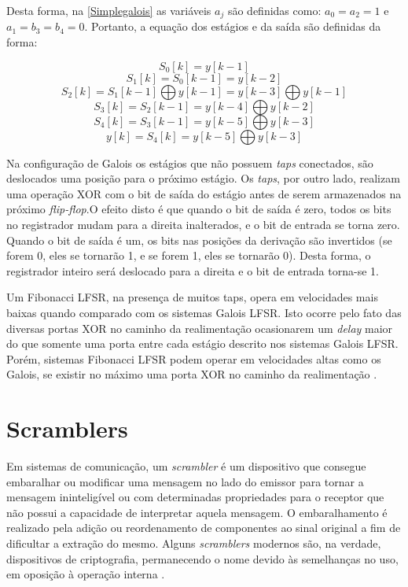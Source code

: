 Desta forma, na \autoref{Simplegalois} as variáveis $ a_{j} $ são definidas como: $ a_{0} = a_{2} = 1 $ e $ a_{1} = b_{3} = b_{4} = 0 $. Portanto, a equação dos estágios e da saída são definidas da forma:

$$ S_{0}[k] = y[k-1]  $$
$$ S_{1}[k] = S_{0}[k-1] = y[k-2]  $$
$$ S_{2}[k] = S_{1}[k-1] \bigoplus y[k-1] = y[k-3] \bigoplus y[k-1] $$
$$ S_{3}[k] = S_{2}[k-1]  =  y[k-4] \bigoplus y[k-2] $$
$$ S_{4}[k] = S_{3}[k-1]  =  y[k-5] \bigoplus y[k-3] $$
$$ y[k] = S_{4}[k] = y[k-5] \bigoplus y[k-3] $$

Na configuração de Galois os estágios que não possuem \textit{taps} conectados, são deslocados uma posição para o próximo estágio. Os \textit{taps}, por outro lado, realizam uma operação XOR com o bit de saída do estágio antes de serem armazenados na próximo \textit{flip-flop}.O efeito disto é que quando o bit de saída é zero, todos os bits no registrador mudam para a direita inalterados, e o bit de entrada se torna zero. Quando o bit de saída é um, os bits nas posições da derivação são invertidos (se forem 0, eles se tornarão 1, e se forem 1, eles se tornarão 0). Desta forma, o registrador inteiro será deslocado para a direita e o bit de entrada torna-se 1.

Um Fibonacci LFSR, na presença de muitos taps, opera em velocidades mais baixas quando comparado com os sistemas Galois LFSR. Isto ocorre pelo fato das diversas portas XOR no caminho da realimentação ocasionarem um \textit{delay} maior do que somente uma porta entre cada estágio descrito nos sistemas Galois LFSR. Porém, sistemas Fibonacci LFSR podem operar em velocidades altas como os Galois, se  existir no máximo uma porta XOR no caminho da realimentação \cite{Sachin2018}.

\chapter[Scramblers]{Scramblers} \label{teo:scrambler}

Em sistemas de comunicação, um \textit{scrambler} é um dispositivo que consegue embaralhar ou modificar uma mensagem no lado do emissor para tornar a mensagem ininteligível ou com determinadas propriedades para o receptor que não possui a capacidade de interpretar aquela mensagem. O embaralhamento é realizado pela adição ou reordenamento de componentes ao sinal original a fim de dificultar a extração do mesmo. Alguns \textit{scramblers} modernos são, na verdade, dispositivos de criptografia, permanecendo o nome devido às semelhanças no uso, em oposição à operação interna \cite{Ghassan2018}.

